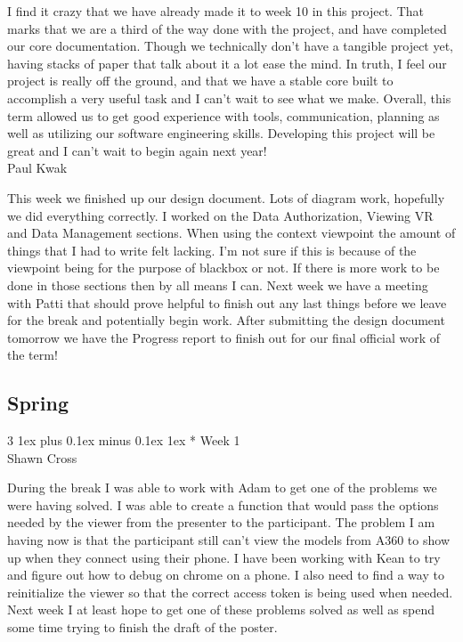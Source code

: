 \documentclass[letterpaper, 10pt, draftclsnofoot, compsoc, onecolumn]{IEEEtran}
\makeatletter
\def\subsubsection{\@startsection{subsubsection}%
                                 {3}%
                                 {\z@}%
                                 {1ex plus 0.1ex minus 0.1ex}%
                                 {1ex}%
                                 {\normalfont\normalsize}}%
\makeatother
\begin{document}
I find it crazy that we have already made it to week 10 in this project. That marks that we are a third of the way done with the project, and have completed our core documentation. Though we technically don't have a tangible project yet, having stacks of paper that talk about it a lot ease the mind. In truth, I feel our project is really off the ground, and that we have a stable core built to accomplish a very useful task and I can't wait to see what we make. Overall, this term allowed us to get good experience with tools, communication, planning as well as utilizing our software engineering skills. Developing this project will be great and I can't wait to begin again next year!\\

Paul Kwak

This week we finished up our design document. Lots of diagram work, hopefully we did everything correctly. I worked on the Data Authorization, Viewing VR and Data Management sections. When using the context viewpoint the amount of things that I had to write felt lacking. I'm not sure if this is because of the viewpoint being for the purpose of blackbox or not. If there is more work to be done in those sections then by all means I can. Next week we have a meeting with Patti that should prove helpful to finish out any last things before we leave for the break and potentially begin work. After submitting the design document tomorrow we have the Progress report to finish out for our final official work of the term!\\

\subsection{Spring}
\subsubsection*{ Week 1}\hspace*{\fill} \\
Shawn Cross

During the break I was able to work with Adam to get one of the problems we were having solved. I was able to create a function that would pass the options needed by the viewer from the presenter to the participant. The problem I am having now is that the participant still can't view the models from A360 to show up when they connect using their phone. I have been working with Kean to try and figure out how to debug on chrome on a phone. I also need to find a way to reinitialize the viewer so that the correct access token is being used when needed. Next week I at least hope to get one of these problems solved as well as spend some time trying to finish the draft of the poster.\\
\end{document}
